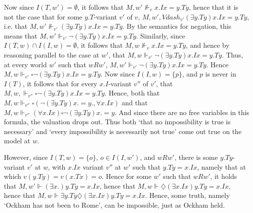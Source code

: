 \documentclass[]{article}
\begin{document}
	Now since $I(T, w') = \emptyset$, it follows that $M, w' \nVdash_{v} x.Ix = y.Ty$, hence that it is not the case that for some $y.T$-variant $v'$ of $v$, $M, w', Vdash_{v'} (\exists y.Ty)x.Ix = y.Ty$, i.e. that $M, w' \nVdash_{v'} (\exists y.Ty)x.Ix = y.Ty$. By the semantics for negation, this means that $M, w' \Vdash_{v'} \neg(\exists y.Ty)x.Ix = y.Ty$. Similarly, since $I(T, w) \cap I(I, w) = \emptyset$, it follows that $M, w \nVdash_{v} x.Ix = y.Ty$, and hence by  reasoning parallel to the case at $w'$, that $M, w \Vdash_{v'} \neg(\exists y.Ty)x.Ix = y.Ty$. Thus, at every world $w'$ such that $wRw'$, $M, w' \Vdash_{v'} \neg(\exists y.Ty)x.Ix=y.Ty$. Hence $M, w \Vdash_{v'} \square \neg(\exists y.Ty)x.Ix=y.Ty$. Now since $I(I, w) = \{p\}$, and $p$ is never in $I(T)$, it follows that for every $x.I$-variant $v''$ of $v'$, that $M, w, \Vdash_{v''} \square \neg (\exists y.Ty) x.Ix = y.Ty$. Hence, both that $M, w \Vdash_{v''} \square(\neg(\exists y.Ty)x.=y., \forall x.Ix)$ and that $M, w \Vdash_{v''} (\forall x.Ix) \square \neg (\exists y.Ty) x.=y.$ And since there are no free variables in this formula, the valuation drops out. Thus both `that no impossibility is true is necessary' and `every impossibility is necessarily not true' come out true on the model at $w$. 
	
	However, since $I(T, w) = \{o\}$, $o \in I(I, w')$, and $wRw'$, there is some $y.Ty$-variant $v'$ at $w$, with $x.Ix$ variant $v''$ at $w'$ such that $y.Ty = x.Ix$, namely that at which $v(y.Ty) = v(x.Tx) = o$. Hence for some $w'$ such that $wRw'$, it holds that $M, w' \Vdash (\exists x.)y.Ty = x.Ix$, hence that $M, w \Vdash \diamondsuit (\exists x.Ix)y.Ty = x.Ix$, hence that $M, w \Vdash \exists y.Ty \diamondsuit (\exists x.Ix)y.Ty = x.Ix$. Hence, some truth, namely `Ockham has not been to Rome', can be impossible, just as Ockham held. 
\end{document}
